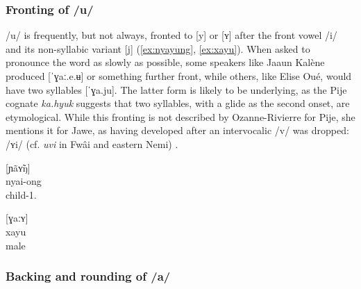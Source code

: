 	\subsubsection{Fronting of /u/}
	\label{ssec:fronting_u}
	/u/ is frequently, but not always, fronted to [y] or [ʏ] after the front %
	 vowel /i/ and its non-syllabic variant [j] (\ref{ex:nyayung}, \ref{ex:xayu}). When asked to pronounce the word as slowly as possible, some speakers like Jaaun Kalène produced [ˈɣaː.e.ʉ] or something further front, while others, like Elise Oué, would have two syllables [ˈɣa.ju]. The latter form is likely to be underlying, as the Pije cognate \textit{ka.hyuk} \parencite[135]{haudricourt_dictionnaire_1982} %
	 suggests that two syllables, with a glide as the second onset, are etymological. While this fronting is not described by Ozanne-Rivierre for Pije, she mentions it for Jawe, as having developed after an intervocalic /v/ was dropped: /ʏi/  (cf. \textit{uvi} in Fwâi and eastern Nemi) \citeyearpar[22]{ozanne-rivierre_phonologie_1982}. %
	
	
	\ea\label{ex:nyayung}
	[ɲãʏ̃ŋ] \goodtilde [ɲãjuŋ]\\
	\gll nyai-ong\\	
	 child-1.\\
		\glt {}
	\z
	
	
	\ea\label{ex:xayu}
	[ɣaːʏ] \goodtilde [ɣaːju̹]\\
	\gll xayu \\ %
	male \\
	\glt {}
	\z
	
	
	\subsubsection{Backing and rounding of /a/}
	
